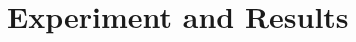 \documentclass[12pt,conference,letterpaper]{IEEEtran}
\begin{document}





\section{Experiment and Results}
\label{sec:results}
\end{document}
